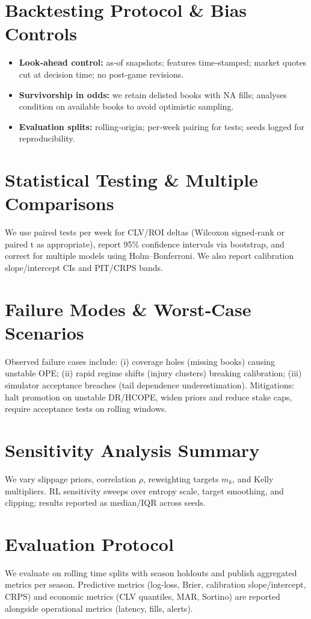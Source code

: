 \section{Backtesting Protocol \& Bias Controls}
\begin{itemize}
  \item \textbf{Look‑ahead control:} as‑of snapshots; features time‑stamped; market quotes cut at decision time; no post‑game revisions.
  \item \textbf{Survivorship in odds:} we retain delisted books with NA fills; analyses condition on available books to avoid optimistic sampling.
  \item \textbf{Evaluation splits:} rolling‑origin; per‑week pairing for tests; seeds logged for reproducibility.
\end{itemize}

\section{Statistical Testing \& Multiple Comparisons}
We use paired tests per week for CLV/ROI deltas (Wilcoxon signed‑rank or paired t as appropriate), report 95\% confidence intervals via bootstrap, and correct for multiple models using Holm–Bonferroni. We also report calibration slope/intercept CIs and PIT/CRPS bands.

\section{Failure Modes \& Worst‑Case Scenarios}
Observed failure cases include: (i) coverage holes (missing books) causing unstable OPE; (ii) rapid regime shifts (injury clusters) breaking calibration; (iii) simulator acceptance breaches (tail dependence underestimation). Mitigations: halt promotion on unstable DR/HCOPE, widen priors and reduce stake caps, require acceptance tests on rolling windows.

\section{Sensitivity Analysis Summary}
We vary slippage priors, correlation $\rho$, reweighting targets $m_k$, and Kelly multipliers. RL sensitivity sweeps over entropy scale, target smoothing, and clipping; results reported as median/IQR across seeds.

\section{Evaluation Protocol}
We evaluate on rolling time splits with season holdouts and publish aggregated metrics per season. Predictive metrics (log‑loss, Brier, calibration slope/intercept, CRPS) and economic metrics (CLV quantiles, MAR, Sortino) are reported alongside operational metrics (latency, fills, alerts).

